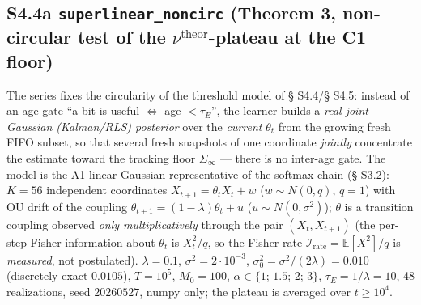 \documentclass[12pt]{iopart}
\providecommand{\texorpdfstring}[2]{#1}
\begin{document}
\subsection{\texorpdfstring{S4.4a \texttt{superlinear\_noncirc} (Theorem 3, non-circular test of the \(\nu^{\text{theor}}\)-plateau at the C1 floor)}{S4.4a superlinear\_noncirc (Theorem 3, non-circular test of the \textbackslash nu\^{}\{\textbackslash text\{theor\}\}-plateau at the C1 floor)}}\label{s4.4a-superlinear_noncirc-theorem-3-non-circular-test-of-the-nutexttheor-plateau-at-the-c1-floor}



The series fixes the circularity of the threshold model of § S4.4/§ S4.5: instead of an age gate ``a bit is useful \(\Leftrightarrow\) age \(< \tau_E\)'', the learner builds a \emph{real joint Gaussian (Kalman/RLS) posterior} over the \emph{current} \(\theta_t\) from the growing fresh FIFO subset, so that several fresh snapshots of one coordinate \emph{jointly} concentrate the estimate toward the tracking floor \(\Sigma_\infty\) --- there is no inter-age gate. The model is the A1 linear-Gaussian representative of the softmax chain (§ S3.2): \(K = 56\) independent coordinates \(X_{t+1} = \theta_t X_t + w\) (\(w\sim N(0,q)\), \(q = 1\)) with OU drift of the coupling \(\theta_{t+1} = (1-\lambda)\theta_t + u\) (\(u\sim N(0,\sigma^2)\)); \(\theta\) is a transition coupling observed \emph{only multiplicatively} through the pair \((X_t,X_{t+1})\) (the per-step Fisher information about \(\theta_t\) is \(X_t^2/q\), so the Fisher-rate \(\mathcal I_{\text{rate}} = \mathbb{E}[X^2]/q\) is \emph{measured}, not postulated). \(\lambda = 0.1\), \(\sigma^2 = 2\cdot10^{-3}\), \(\sigma_0^2 = \sigma^2/(2\lambda) = 0.010\) (discretely-exact \(0.0105\)), \(T = 10^5\), \(M_0 = 100\), \(\alpha \in \{1;\,1.5;\,2;\,3\}\), \(\tau_E = 1/\lambda = 10\), 48 realizations, seed \(20260527\), numpy only; the plateau is averaged over \(t \ge 10^4\).
\end{document}
